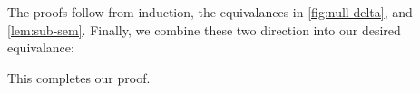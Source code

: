 %
The proofs follow from induction, the equivalances in \cref{fig:null-delta}, and
\cref{lem:sub-sem}.  Finally, we combine these two direction into our desired
equivalance:
%
\begin{code}%
%
\>[4]\AgdaSpace{}%
\AgdaSymbol{\{}\AgdaSpace{}%
\AgdaSymbol{=}\AgdaSpace{}%
\AgdaSymbol{\}}\AgdaSpace{}%
\AgdaSymbol{=}\AgdaSpace{}%
\AgdaSpace{}%
\AgdaSymbol{(}\AgdaSpace{}%
\AgdaSpace{}%
\AgdaSpace{}%
\AgdaSpace{}%
\AgdaSpace{}%
\AgdaSymbol{)}\AgdaSpace{}%
\AgdaSymbol{(}\AgdaSpace{}%
\AgdaSpace{}%
\AgdaSpace{}%
\AgdaSpace{}%
\AgdaSpace{}%
\AgdaSymbol{)}\<%
\end{code}
%
This completes our proof.

